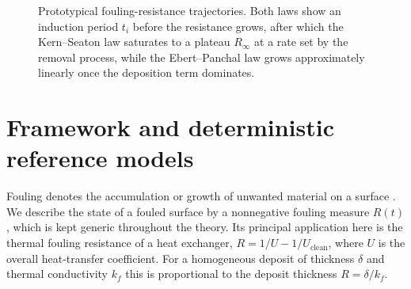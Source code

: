 \documentclass[preprint,12pt]{elsarticle}
\begin{document}
\begin{figure}[tb]
\centering
{}
\caption{Prototypical fouling-resistance trajectories. Both laws show
an induction period $t_i$ before the resistance grows, 
after which the Kern--Seaton law saturates to a plateau
$R_\infty$ at a rate set by the removal process, while the Ebert--Panchal
law grows approximately linearly once the deposition term dominates.}
\label{fig:models}
\end{figure}


\section{Framework and deterministic reference models}
\label{sec:theory}

Fouling denotes the accumulation or growth of unwanted material on a
surface \cite{Epstein1983,Bott1995,AugustinMeloWilson2025}. We describe the
state of a fouled surface by a nonnegative fouling measure $R(t)$, which is
kept generic throughout the theory. Its principal application here is the
thermal fouling resistance of a heat exchanger,
$R=1/U-1/U_{\mathrm{clean}}$,
where $U$ is the overall heat-transfer coefficient. 
For a homogeneous deposit of thickness $\delta$
and thermal conductivity $k_f$ this is proportional to the deposit 
thickness $R=\delta/k_f$. 
\end{document}

